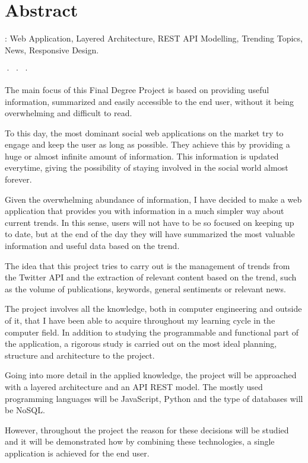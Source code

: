 \begingroup

\chapter*{Abstract}

\noindent{}: Web Application, Layered Architecture, REST API Modelling, Trending Topics, News, Responsive Design.
\begin{center}
· · ·
\end{center}

The main focus of this Final Degree Project is based on providing useful information, summarized and easily accessible to the end user, without it being overwhelming and difficult to read.

\vspace{0.3cm}

To this day, the most dominant social web applications on the market try to engage and keep the user as long as possible. They achieve this by providing a huge or almost infinite amount of information. This information is updated everytime, giving the possibility of staying involved in the social world almost forever.

\vspace{0.3cm}

Given the overwhelming abundance of information, I have decided to make a web application that provides you with information in a much simpler way about current trends. In this sense, users will not have to be so focused on keeping up to date, but at the end of the day they will have summarized the most valuable information and useful data based on the trend.

\vspace{0.3cm}

The idea that this project tries to carry out is the management of trends from the Twitter API and the extraction of relevant content based on the trend, such as the volume of publications, keywords, general sentiments or relevant news.

\vspace{0.3cm}

The project involves all the knowledge, both in computer engineering and outside of it, that I have been able to acquire throughout my learning cycle in the computer field. In addition to studying the programmable and functional part of the application, a rigorous study is carried out on the most ideal planning, structure and architecture to the project.

\vspace{0.3cm}

Going into more detail in the applied knowledge, the project will be approached with a layered architecture and an API REST model. The mostly used programming languages will be JavaScript, Python and the type of databases will be NoSQL.

\vspace{0.3cm}

However, throughout the project the reason for these decisions will be studied and it will be demonstrated how by combining these technologies, a single application is achieved for the end user.

\vfill
